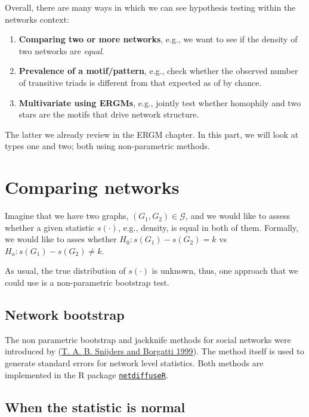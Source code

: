 \documentclass[
]{book}
\begin{document}
Overall, there are many ways in which we can see hypothesis testing within
the networks context:

\begin{enumerate}
\def\labelenumi{\arabic{enumi}.}
\item
  \textbf{Comparing two or more networks}, e.g., we want to see if the density of
  two networks are \emph{equal}.
\item
  \textbf{Prevalence of a motif/pattern}, e.g., check whether the observed number
  of transitive triads is different from that expected as of by chance.
\item
  \textbf{Multivariate using ERGMs}, e.g., jointly test whether homophily and
  two stars are the motifs that drive network structure.
\end{enumerate}

The latter we already review in the ERGM chapter. In this part, we will look
at types one and two; both using non-parametric methods.

\hypertarget{comparing-networks}{%
\section{Comparing networks}\label{comparing-networks}}

Imagine that we have two graphs, \((G_1,G_2) \in \mathcal{G}\), and we would like
to assess whether a given statistic \(s(\cdot)\), e.g., density, is equal in both of them.
Formally, we would like to asses whether \(H_0: s(G_1) - s(G_2) = k\) vs
\(H_a: s(G_1) - s(G_2) \neq k\).

As usual, the true distribution of \(s(\cdot)\) is unknown, thus, one approach that
we could use is a non-parametric bootstrap test.

\hypertarget{network-bootstrap}{%
\subsection{Network bootstrap}\label{network-bootstrap}}

The non parametric bootstrap and jackknife methods for social networks were
introduced by (\protect\hyperlink{ref-Snijders1999}{T. A. B. Snijders and Borgatti 1999}). The method itself is used to generate standard
errors for network level statistics. Both methods are implemented in the R
package \href{https://cran.r-project.org/package=netdiffuseR}{\texttt{netdiffuseR}}.

\hypertarget{when-the-statistic-is-normal}{%
\subsection{When the statistic is normal}\label{when-the-statistic-is-normal}}
\end{document}
